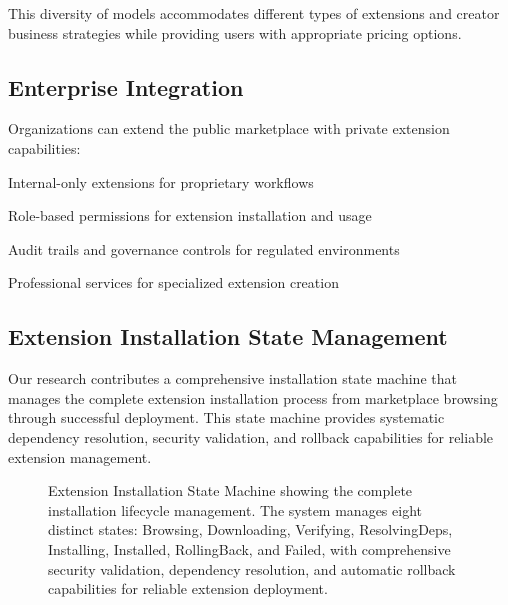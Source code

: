 This diversity of models accommodates different types of extensions and creator business strategies while providing users with appropriate pricing options.

\subsection*{Enterprise Integration}

Organizations can extend the public marketplace with private extension capabilities:

\begin{description}[leftmargin=4cm,labelwidth=3.5cm]
    \item[\textbf{Private Registries}] Internal-only extensions for proprietary workflows
    \item[\textbf{Access Control}] Role-based permissions for extension installation and usage
    \item[\textbf{Compliance}] Audit trails and governance controls for regulated environments
    \item[\textbf{Custom Development}] Professional services for specialized extension creation
\end{description}

\subsection*{Extension Installation State Management}

Our research contributes a comprehensive installation state machine that manages the complete extension installation process from marketplace browsing through successful deployment. This state machine provides systematic dependency resolution, security validation, and rollback capabilities for reliable extension management.

\begin{figure}[h]
\centering
\caption{Extension Installation State Machine showing the complete installation lifecycle management. The system manages eight distinct states: Browsing, Downloading, Verifying, ResolvingDeps, Installing, Installed, RollingBack, and Failed, with comprehensive security validation, dependency resolution, and automatic rollback capabilities for reliable extension deployment.}
\label{fig:extension-installation-states}
\end{figure}

